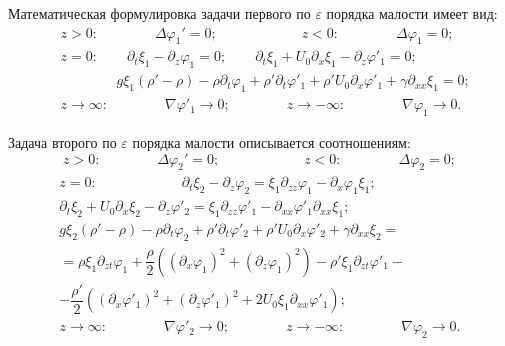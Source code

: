Математическая формулировка  задачи первого по $ \varepsilon $ порядка малости имеет вид:
\begin{align}
&z>0 : \qquad \qquad \Delta \varphi_{1}'=0; \qquad \qquad \qquad  z<0 : \qquad \qquad \Delta \varphi_{1}=0; \label{Eul1}
\\
&z=0 : \qquad \partial_{t}\xi_{1} -\partial_{z} \varphi_{1}=0 ; \qquad  \partial_{t}\xi_{1} + U_{0}  \partial_{x} \xi_{1} -\partial_{z} \varphi'_{1}=0 ;
\\
&\qquad \qquad g \xi_{1}\left( \rho' -\rho \right)-\rho \partial_{t} \varphi_{1}+\rho' \partial_{t} \varphi'_{1}+\rho' U_{0} \partial_{x} \varphi'_{1}+\gamma \partial_{xx}\xi_{1}=0 ;
\\
&z\rightarrow \infty : \qquad \qquad \nabla \varphi'_{1} \rightarrow 0 ;\qquad \qquad z\rightarrow -\infty :\qquad \qquad \nabla \varphi_{1} \rightarrow 0.\label{Besk1}
\end{align}

Задача второго по $ \varepsilon $ порядка малости описывается соотношениям:
\begin{equation}
z>0 : \qquad \qquad \Delta \varphi_{2}'=0; \qquad \qquad \qquad  z<0 : \qquad \qquad \Delta \varphi_{2}=0;\label{Eul2}
\end{equation} 
\begin{gather}
\begin{gathered}
z=0 : \mspace{108mu} \partial_{t}\xi_{2} -\partial_{z} \varphi_{2}=\xi_{1} \partial_{zz}\varphi_{1}-\partial_{x}\varphi_{1}\xi_{1};\mspace{108mu}
\\ 
 \partial_{t}\xi_{2} + U_{0}  \partial_{x} \xi_{2} -\partial_{z} \varphi'_{2}=\xi_{1} \partial_{zz} \varphi'_{1}-\partial_{xx}\varphi'_{1} \partial_{xx}\xi_{1} ;
\\
 g \xi_{2}\left( \rho' -\rho \right)-\rho \partial_{t} \varphi_{2}+\rho' \partial_{t} \varphi'_{2}+\rho' U_{0} \partial_{x} \varphi'_{2}+\gamma \partial_{xx}\xi_{2}= \\
 =\rho \xi_{1} \partial_{zt} \varphi_{1}+\dfrac{\rho}{2}\left( \left( \partial_{x}\varphi_{1}\right)^{2} +\left( \partial_{z}\varphi_{1}\right)^{2}\right)- \rho' \xi_{1} \partial_{zt} \varphi'_{1} - \\
 -\dfrac{\rho'}{2} \left( \left( \partial_{x}\varphi'_{1}\right)^{2} +\left( \partial_{z}\varphi'_{1}\right)^{2}+2U_{0} \xi_{1} \partial_{xx} \varphi'_{1}\right); \label{GU2}
\end{gathered}
\end{gather}
\begin{equation}
z\rightarrow \infty : \qquad \qquad \nabla \varphi'_{2} \rightarrow 0 ;\qquad \qquad z\rightarrow -\infty :\qquad \qquad \nabla \varphi_{2} \rightarrow 0.\label{Besk2}
\end{equation}

